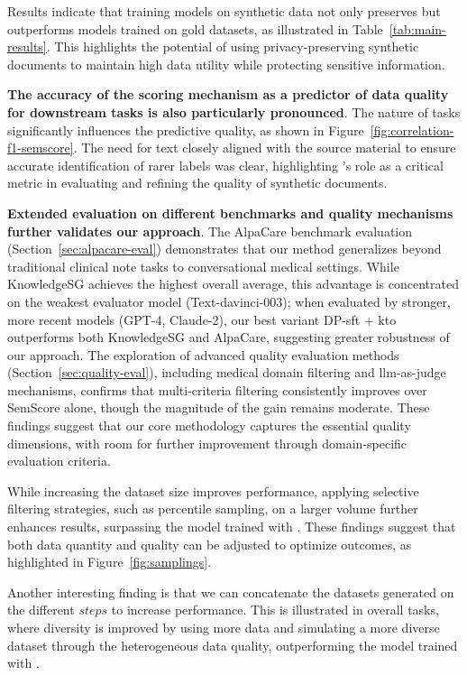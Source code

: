 Results indicate that training models on synthetic data not only preserves but outperforms models trained on gold datasets, as illustrated in Table~\ref{tab:main-results}.
This highlights the potential of using privacy-preserving synthetic documents to maintain high data utility while protecting sensitive information.

\textbf{The accuracy of the \score scoring mechanism as a predictor of data quality for downstream tasks is also particularly pronounced}. The nature of tasks significantly influences the predictive quality, as shown in Figure~\ref{fig:correlation-f1-semscore}. The need for text closely aligned with the source material to ensure accurate identification of rarer labels was clear, highlighting \score's role as a critical metric in evaluating and refining the quality of synthetic documents.

\textbf{Extended evaluation on different benchmarks and quality mechanisms further validates our approach}. The AlpaCare benchmark evaluation (Section~\ref{sec:alpacare-eval}) demonstrates that our method generalizes beyond traditional clinical note tasks to conversational medical settings.
While KnowledgeSG achieves the highest overall average, this advantage is concentrated on the weakest evaluator model (Text-davinci-003); when evaluated by stronger, more recent models (GPT-4, Claude-2), our best variant DP-\gls{sft} + \gls{kto} outperforms both KnowledgeSG and AlpaCare, suggesting greater robustness of our approach.
The exploration of advanced quality evaluation methods (Section~\ref{sec:quality-eval}), including medical domain filtering and \gls{llm}-as-judge mechanisms, confirms that multi-criteria filtering consistently improves over SemScore alone, though the magnitude of the gain remains moderate.
These findings suggest that our core methodology captures the essential quality dimensions, with room for further improvement through domain-specific evaluation criteria.

While increasing the dataset size improves performance, applying selective filtering strategies, such as percentile sampling, on a larger volume further enhances results, surpassing the model trained with \dgold. These findings suggest that both data quantity and quality can be adjusted to optimize outcomes, as highlighted in Figure~\ref{fig:samplings}.

Another interesting finding is that we can concatenate the datasets generated on the different $steps$ to increase performance. This is illustrated in overall tasks, where diversity is improved by using more data and simulating a more diverse dataset through the heterogeneous data quality, outperforming the model trained with \dgover.

